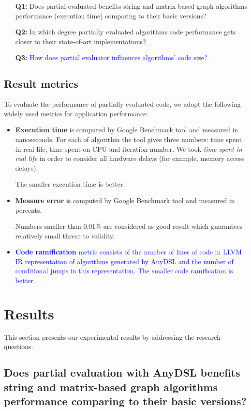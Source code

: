 \documentclass[conference]{IEEEtran}
\begin{document}
\begin{itemize}
	\item[\textbf{Q1:}] Does partial evaluated benefits string and matrix-based graph algorithms performance (execution time) comparing to their basic versions?
	\item[\textbf{Q2:}] In which degree partially evaluated algorithms code performance gets closer to their state-of-art implementations?
	\item[\textbf{Q3:}] \textcolor{blue}{How does partial evaluator influences algorithms' code size?}
\end{itemize}

\subsection{Result metrics}
To evaluate the performance of partially evaluated code, we adopt the following widely used metrics for application performance:
\begin{itemize}
	\item \textbf{Execution time} is computed by Google Benchmark tool and measured in nanoseconds. For each of algorithm the tool gives three numbers: time spent in real life, time spent on CPU and iteration number. We took \textit{time spent in real life} in order to consider all hardware delays (for example, memory access delays).
	
	The smaller execution time is better.
	
	\item \textbf{Measure error} is computed by Google Benchmark tool and measured in percents. 
	
	Numbers smaller than $0.01\%$ are considered as good result which guarantees relatively small threat to validity.
	
	\item \textcolor{blue}{\textbf{Code ramification} metric consists of the number of lines of code in LLVM IR representation of algorithms generated by AnyDSL and the number of conditional jumps in this representation.	
	The smaller code ramification is better.}
\end{itemize}

\section{Results}
This section presents our experimental results by addressing the research questions.

\subsection{Does partial evaluation with AnyDSL benefits string and matrix-based graph algorithms performance comparing to their basic versions?}
\end{document}
